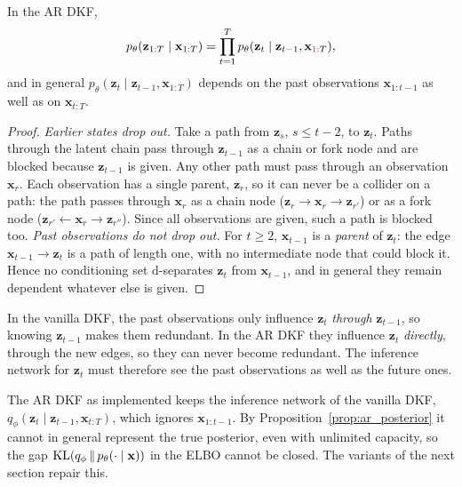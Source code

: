 \begin{proposition}\label{prop:ar_posterior}
In the AR DKF,
\begin{equation*}
    p_\theta(\mathbf{z}_{1:T} \mid \mathbf{x}_{1:T}) =
    \prod_{t=1}^T p_\theta(\mathbf{z}_t \mid \mathbf{z}_{t-1},
    \mathbf{x}_{\textcolor{red}{1}:T}),
\end{equation*}
and in general $p_\theta(\mathbf{z}_t \mid \mathbf{z}_{t-1},
\mathbf{x}_{1:T})$ depends on the past observations
$\mathbf{x}_{1:t-1}$ as well as on $\mathbf{x}_{t:T}$.
\end{proposition}
\begin{proof}
\emph{Earlier states drop out.} Take a path from $\mathbf{z}_s$, $s
\leq t-2$, to $\mathbf{z}_t$. Paths through the latent chain pass
through $\mathbf{z}_{t-1}$ as a chain or fork node and are blocked
because $\mathbf{z}_{t-1}$ is given. Any other path must pass through an
observation $\mathbf{x}_r$. Each observation has a single parent,
$\mathbf{z}_r$, so it can never be a collider on a path: the path passes
through $\mathbf{x}_r$ as a chain node ($\mathbf{z}_r \to \mathbf{x}_r
\to \mathbf{z}_{r'}$) or as a fork node ($\mathbf{z}_{r'} \leftarrow
\mathbf{x}_r \to \mathbf{z}_{r''}$). Since all observations are given,
such a path is blocked too.
\emph{Past observations do not drop out.} For $t \geq 2$,
$\mathbf{x}_{t-1}$ is a \emph{parent} of $\mathbf{z}_t$: the edge
$\mathbf{x}_{t-1} \to \mathbf{z}_t$ is a path of length one, with no
intermediate node that could block it. Hence no conditioning set
d-separates $\mathbf{z}_t$ from $\mathbf{x}_{t-1}$, and in general they
remain dependent whatever else is given.
\end{proof}

\begin{inwords}
In the vanilla DKF, the past observations only influence $\mathbf{z}_t$
\emph{through} $\mathbf{z}_{t-1}$, so knowing $\mathbf{z}_{t-1}$ makes
them redundant. In the AR DKF they influence $\mathbf{z}_t$
\emph{directly}, through the new edges, so they can never become
redundant. The inference network for $\mathbf{z}_t$ must therefore see
the past observations as well as the future ones.
\end{inwords}

The AR DKF as implemented keeps the inference network of the vanilla
DKF, $q_\phi(\mathbf{z}_t \mid \mathbf{z}_{t-1}, \mathbf{x}_{t:T})$,
which ignores $\mathbf{x}_{1:t-1}$. By Proposition~\ref{prop:ar_posterior}
it cannot in general represent the true posterior, even with unlimited
capacity, so the gap $\mathrm{KL}(q_\phi \,\|\, p_\theta(\cdot \mid \mathbf{x}))$
in the ELBO cannot be closed. The variants of the next section repair this.

